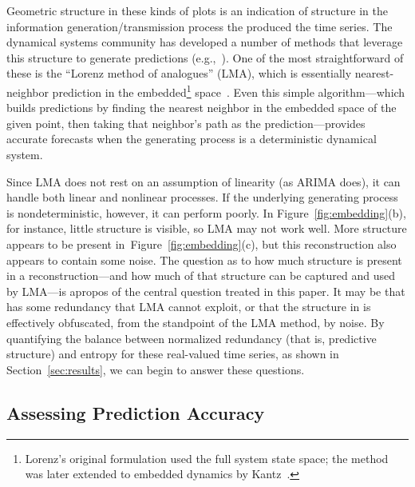 Geometric structure in these kinds of plots is an indication of
structure in the information generation/transmission process the
produced the time series.  The dynamical systems community has
developed a number of methods that leverage this structure to generate
predictions (e.g.,~\cite{weigend-book,casdagli-eubank92,Smith199250}).
One of the most straightforward of these is the ``Lorenz method of
analogues'' (LMA), which is essentially nearest-neighbor prediction in
the embedded\footnote{Lorenz's original formulation used the full
  system state space; the method was later extended to embedded
  dynamics by Kantz~\cite{kantz-lma-citation}.}
space~\cite{lorenz-analogues}.  Even this simple algorithm---which
builds predictions by finding the nearest neighbor in the embedded
space of the given point, then taking that neighbor's path as the
prediction---provides accurate forecasts when the generating process
is a deterministic dynamical system.  

Since LMA does not rest on an assumption of linearity (as ARIMA does),
it can handle both linear and nonlinear processes.  If the underlying
generating process is nondeterministic, however, it can perform
poorly.  In Figure~\ref{fig:embedding}(b), for instance, little
structure is visible, so LMA may not work well.  More structure
appears to be present in~Figure~\ref{fig:embedding}(c), but this
reconstruction also appears to contain some noise.  The question as to
how much structure is present in a reconstruction---and how much of
that structure can be captured and used by LMA---is apropos of the
central question treated in this paper.  It may be that \gcc has some
redundancy that LMA cannot exploit, or that the structure in \svdfive
is effectively obfuscated, from the standpoint of the LMA method, by
noise.  By quantifying the balance between normalized redundancy (that
is, predictive structure) and entropy for these real-valued time
series, as shown in Section~\ref{sec:results}, we can begin to answer
these questions.


\subsection{Assessing Prediction Accuracy}
\label{sec:accuracy}

